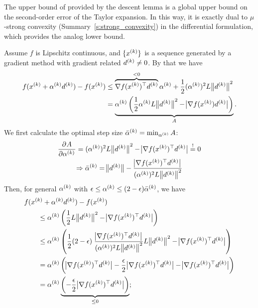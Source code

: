 \documentclass{article}
\begin{document}
The upper bound of provided by the descent lemma is a global upper bound on the second-order error
of the Taylor expansion.  In this way, it is exactly dual to \(\mu\)-strong convexity
(Summary~\ref{s:strong_convexity}) in the differential formulation, which provides the analog
lower bound.



Assume \(f\) is Lipschitz continuous, and \(\{x^{(k)}\}\) is a sequence generated by a gradient
method with gradient related \(d^{(k)} \neq 0\).  By that we have
\begin{align*}
  f(\kth{x} + \kth{\alpha}\kth{d}) - f(\kth{x})
  &\leq \overbrace{\T{\nabla f(\kth{x})} \kth{d}}^{< 0} \kth{\alpha} +
    \frac{1}{2} (\kth{\alpha})^2 L \enVert[1]{\kth{d}}^2 \\
  &= \underbrace{\kth{\alpha} \left( \frac{1}{2} \kth{\alpha} L \enVert[1]{\kth{d}}^2
    - \envert[1]{\nabla f(\kth{x}) \kth{d}} \right)}_{A}.
\end{align*}
We first calculate the optimal step size \(\bar{\alpha}^{(k)} = \min_{\alpha^{(k)}} A\):
\begin{gather*}
  \dpd{A}{{\kth{\alpha}}} = (\kth{\alpha})^2 L \enVert[1]{\kth{d}}^2 - \envert[1]{\T{\nabla
                            f(\kth{x})} \kth{d}} \overset{!}{=} 0 \\
  \Rightarrow \kth{\bar{\alpha}} = \enVert[1]{\kth{d}} - \frac{\envert[1]{\T{\nabla
                       f(\kth{x})} \kth{d}}}{(\kth{\alpha})^2 L \enVert[1]{\kth{d}}^2}
\end{gather*}
Then, for general \(\alpha^{(k)}\) with
\(\epsilon \leq \alpha^{(k)} \leq (2 - \epsilon)\bar{\alpha}^{(k)}\), we have
\begin{align*}
  &f(\kth{x} + \kth{\alpha}\kth{d}) - f(\kth{x}) \\
  &\qquad \leq \kth{\alpha} \left( \frac{1}{2} L \enVert[1]{\kth{d}}^2
    - \envert[1]{\T{\nabla f(\kth{x})} \kth{d}} \right) \\
  &\qquad \leq \kth{\alpha} \left( \frac{1}{2} (2 - \epsilon)\; \frac{\envert[1]{\T{\nabla
    f(\kth{x})} \kth{d}}}{(\kth{\alpha})^2 L \enVert[1]{\kth{d}}^2} L \enVert[1]{\kth{d}}^2
    - \envert[1]{\T{\nabla f(\kth{x})} \kth{d}} \right) \\
  &\qquad = \kth{\alpha} \left( \envert[1]{\T{\nabla f(\kth{x})} \kth{d}}
    - \frac{\epsilon}{2} \envert[1]{\T{\nabla f(\kth{x})} \kth{d}}
    - \envert[1]{\T{\nabla f(\kth{x})} \kth{d}} \right) \\
  &\qquad = \kth{\alpha} \underbrace{\left( -\frac{\epsilon}{2}\envert[1]{\T{\nabla f(\kth{x})} \kth{d}}
    \right)}_{\leq 0};
\end{align*}
\end{document}
